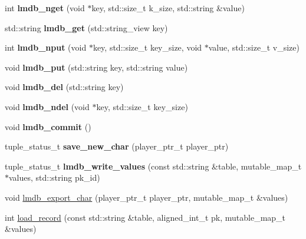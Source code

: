 \begin{DoxyCompactItemize}
int {\bfseries lmdb\+\_\+nget} (void $\ast$key, std\+::size\+\_\+t k\+\_\+size, std\+::string \&value)
\item 
\mbox{\label{namespacemods_1_1db_a76eb530e6b65cbed6c0462ccd14cdc94}} 
std\+::string {\bfseries lmdb\+\_\+get} (std\+::string\+\_\+view key)
\item 
\mbox{\label{namespacemods_1_1db_ab9ca8045480b5c845000f2dda073939e}} 
int {\bfseries lmdb\+\_\+nput} (void $\ast$key, std\+::size\+\_\+t key\+\_\+size, void $\ast$value, std\+::size\+\_\+t v\+\_\+size)
\item 
\mbox{\label{namespacemods_1_1db_aa7e3b257ce6a2920b088cc798af79da6}} 
void {\bfseries lmdb\+\_\+put} (std\+::string key, std\+::string value)
\item 
\mbox{\label{namespacemods_1_1db_a5fbce517ac53231aa35c7d9c58622ce2}} 
void {\bfseries lmdb\+\_\+del} (std\+::string key)
\item 
\mbox{\label{namespacemods_1_1db_af13cbeaf36d1892265aca37289d5c7cc}} 
void {\bfseries lmdb\+\_\+ndel} (void $\ast$key, std\+::size\+\_\+t key\+\_\+size)
\item 
\mbox{\label{namespacemods_1_1db_a2ecd0fbb4254d5de7539205ae7b97f8a}} 
void {\bfseries lmdb\+\_\+commit} ()
\item 
\mbox{\label{namespacemods_1_1db_a8bccbc433ca6a53482a62f5181230d9b}} 
tuple\+\_\+status\+\_\+t {\bfseries save\+\_\+new\+\_\+char} (player\+\_\+ptr\+\_\+t player\+\_\+ptr)
\item 
\mbox{\label{namespacemods_1_1db_a1679c965eb39cf4c1c28f9670c4dbd26}} 
tuple\+\_\+status\+\_\+t {\bfseries lmdb\+\_\+write\+\_\+values} (const std\+::string \&table, mutable\+\_\+map\+\_\+t $\ast$values, std\+::string pk\+\_\+id)
\item 
void \hyperlink{namespacemods_1_1db_a2cb0a00d3700b5eab314405d909a8cce}{lmdb\+\_\+export\+\_\+char} (player\+\_\+ptr\+\_\+t player\+\_\+ptr, mutable\+\_\+map\+\_\+t \&values)
\item 
int \hyperlink{namespacemods_1_1db_acf6aefd449f5fcb8d9987a37cc1d7ba8}{load\+\_\+record} (const std\+::string \&table, aligned\+\_\+int\+\_\+t pk, mutable\+\_\+map\+\_\+t \&values)

\end{DoxyCompactItemize}
